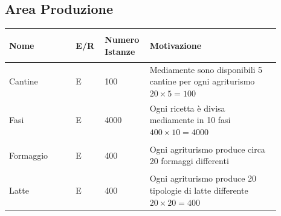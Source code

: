 \documentclass[12pt,a4paper]{article}
\begin{document}
\subsection{Area Produzione}
\begin{center}
\setlength{\extrarowheight}{1.5pt}
\begin{longtable}{|p{0.23\linewidth}|p{0.1\linewidth}|p{0.11\linewidth}|p{0.45\linewidth}|}
\hline \textbf{Nome} 	& \begin{center}\vspace{-15pt}\textbf{E/R}\end{center} & \textbf{Numero Istanze} & \textbf{Motivazione}\\ 

    
\hline
Cantine 				& \begin{center}
\vspace{-25pt}E
\end{center}
					& \begin{center}
					\vspace{-25pt}100\end{center}
					&  Mediamente sono disponibili 5 cantine per ogni agriturismo $20\times 5=100$ \\ 

\hline
Fasi 				& \begin{center}
\vspace{-25pt}E
\end{center}
					& \begin{center}
					\vspace{-25pt}4000\end{center}
					&  Ogni ricetta è divisa mediamente in 10 fasi $400\times 10 = 4000$\\ 

\hline
Formaggio 				& \begin{center}
\vspace{-25pt}E
\end{center}
					& \begin{center}
					\vspace{-25pt}400\end{center}
					&  Ogni agriturismo produce circa 20 formaggi differenti \\ 

\hline
Latte 				& \begin{center}
\vspace{-25pt}E
\end{center}
					& \begin{center}
					\vspace{-25pt}400\end{center}
					&  Ogni agriturismo produce 20 tipologie di latte differente $20\times 20 = 400$\\ 


\end{longtable}
\end{center}
\end{document}
